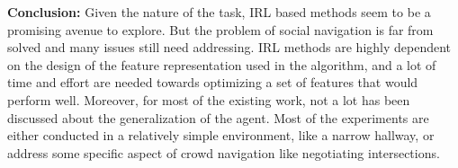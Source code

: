 \textbf{Conclusion:}
Given the nature of the task, IRL based methods seem to be a promising avenue to explore. But the problem of social navigation is far from solved and many issues still need addressing. IRL methods are highly dependent on the design of the feature representation used in the algorithm, and a lot of time and effort are needed towards optimizing a set of features that would perform well. Moreover, for most of the existing work, not a lot has been discussed about the generalization of the agent. Most of the experiments are either conducted in a relatively simple environment, like a narrow hallway, or address some specific aspect of crowd navigation like negotiating intersections. 


